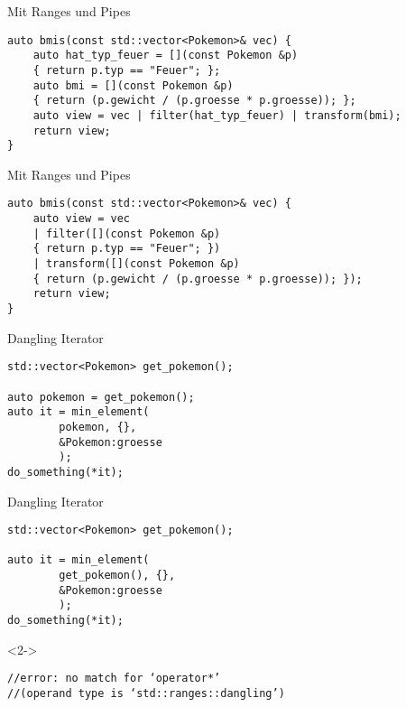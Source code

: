 \begin{frame}[fragile]{Mit Ranges und Pipes}
	\begin{verbatim}
auto bmis(const std::vector<Pokemon>& vec) {
    auto hat_typ_feuer = [](const Pokemon &p)
    { return p.typ == "Feuer"; };
    auto bmi = [](const Pokemon &p)
    { return (p.gewicht / (p.groesse * p.groesse)); };
    auto view = vec | filter(hat_typ_feuer) | transform(bmi);
    return view;
}
\end{verbatim}
\end{frame}

\begin{frame}[fragile]{Mit Ranges und Pipes}
	\begin{verbatim}
auto bmis(const std::vector<Pokemon>& vec) {
    auto view = vec
    | filter([](const Pokemon &p)
    { return p.typ == "Feuer"; })
    | transform([](const Pokemon &p)
    { return (p.gewicht / (p.groesse * p.groesse)); });
    return view;
}
\end{verbatim}
\end{frame}

\begin{frame}[fragile]{Dangling Iterator}
	\begin{overlayarea}{\linewidth}{3cm}
		\begin{verbatim}
std::vector<Pokemon> get_pokemon();

auto pokemon = get_pokemon();
auto it = min_element(
        pokemon, {},
        &Pokemon:groesse
        );
do_something(*it);
    \end{verbatim}
	\end{overlayarea}
\end{frame}

\begin{frame}[fragile]{Dangling Iterator}
	\begin{overlayarea}{\linewidth}{3cm}
		\begin{verbatim}
std::vector<Pokemon> get_pokemon();

auto it = min_element(
        get_pokemon(), {},
        &Pokemon:groesse
        );
do_something(*it);
    \end{verbatim}
		\begin{onlyenv}<2->
			\begin{verbatim}
//error: no match for ‘operator*’
//(operand type is ‘std::ranges::dangling’)
        \end{verbatim}
		\end{onlyenv}
	\end{overlayarea}
\end{frame}

